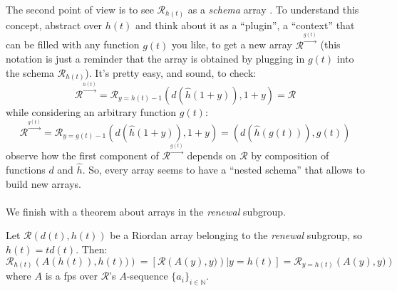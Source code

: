 The second point of view is to see $\mathcal{R}_{h(t)}$ as a \emph{schema} array 
.
To understand this concept, abstract over $h(t)$ and think about it as a ``plugin'', 
a ``context'' that can be filled with any function $g(t)$ you like, to get a new array
$\mathcal{R}^{\stackrel{g(t)}{\rightarrow}}$ (this notation is just a reminder that the array is obtained
by plugging in $g(t)$ into the schema $\mathcal{R}_{h(t)}$). It's pretty easy, and sound, to check:
\begin{displaymath}
    \mathcal{R}^{\stackrel{h(t)}{\rightarrow}} = \mathcal{R}_{y=h(t)-1}\left( d(\hat{h}(1+y)), 1+y \right) = \mathcal{R}
\end{displaymath}
while considering an arbitrary function $g(t)$:
\begin{displaymath}
    \mathcal{R}^{\stackrel{g(t)}{\rightarrow}} = \mathcal{R}_{y=g(t)-1}\left( d(\hat{h}(1+y)), 1+y \right) = 
    \left( d(\hat{h}(g(t))), g(t) \right) 
\end{displaymath}
observe how the first component of $\mathcal{R}^{\stackrel{g(t)}{\rightarrow}}$ depends on
$\mathcal{R}$ by composition of functions $d$ and $\hat{h}$. So, every array seems to have
a ``nested schema'' that allows to build new arrays.
\\\\
We finish with a theorem about arrays in the \emph{renewal} subgroup.

\begin{theorem}
    Let $\mathcal{R}\left(d(t), h(t)\right)$ be a Riordan array belonging
    to the \emph{renewal} subgroup, so $h(t)=td(t)$. Then:
    \begin{displaymath}
        \mathcal{R}_{h(t)}\left(A(h(t)), h(t))\right)=
        \left[\left.\mathcal{R}\left(A(y), y)\right)\right|y=h(t)\right] =
        \mathcal{R}_{y=h(t)}\left(A(y), y)\right)
    \end{displaymath}
    where $A$ is a \ac{fps} over $\mathcal{R}$'s $A$-sequence 
    $\lbrace a_i \rbrace_{i\in\mathbb{N}}$. 
\end{theorem}

